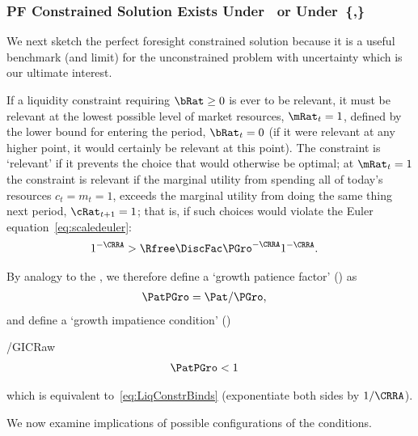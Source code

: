 \documentclass[BufferStockTheory]{subfiles}
\begin{document}
\hypertarget{PF-Constrained-Solution}{}
\hypertarget{Constrained-Solution}{}
\subsubsection{PF Constrained Solution Exists Under~\texorpdfstring{{\RIC}}{RIC} or Under~\texorpdfstring{\{\cncl{\RIC},\GICRaw\}}{RIC-Fails,GIC}}\label{subsec:PFCon}

We next sketch the perfect foresight constrained solution because it is a useful benchmark (and limit) for the unconstrained problem with uncertainty which is our ultimate interest.

If a liquidity constraint requiring $\bRat \geq 0$ is ever to be relevant, it must be relevant at the lowest possible level of market resources, $\mRat_{t}=1$, defined by the lower bound for entering the period, $\bRat_{t}=0$ (if it were relevant at any higher point, it would certainly be relevant at this point).  The constraint is `relevant' if it prevents the choice that would otherwise be optimal; at $\mRat_{t}=1$ the constraint is relevant if the marginal utility from spending all of today's resources $c_{t}=m_{t}=1$, exceeds the marginal utility from doing the same thing next period, $\cRat_{t+1}=1$; that is, if such choices would violate the Euler equation~\eqref{eq:scaledeuler}:
\begin{align}
  1^{-\CRRA}  & > \Rfree \DiscFac \PGro^{-\CRRA}1^{-\CRRA}  \label{eq:LiqConstrBinds}.
\end{align}

\hypertarget{GPFRaw}{}
\hypertarget{GICRaw}{}
By analogy to the \RPF, we therefore define a `growth patience factor' (\GPFRaw) as
\begin{align}
  \PatPGro  & = {\Pat}/\PGro,  \label{eq:GPFRaw}
\end{align}
and define a `growth impatience condition' (\GICRaw)
\begin{verbatimwrite}{\EqDir/GICRaw}
\begin{align}
  \PatPGro &  < 1   \label{eq:GICRaw}
\end{align}
\end{verbatimwrite}

which is equivalent to~\eqref{eq:LiqConstrBinds} (exponentiate both
sides by $1/\CRRA$).

We now examine implications of possible configurations of the conditions.
\end{document}

